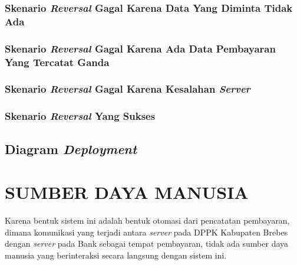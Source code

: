 \documentclass[pdftex,12pt, oneside]{article}
\begin{document}
\subsubsection{Skenario \textit{Reversal} Gagal Karena Data Yang Diminta Tidak Ada}
\subsubsection{Skenario \textit{Reversal} Gagal Karena Ada Data Pembayaran Yang Tercatat Ganda}
\subsubsection{Skenario \textit{Reversal} Gagal Karena Kesalahan \textit{Server}}
\subsubsection{Skenario \textit{Reversal} Yang Sukses}

\subsection{Diagram \textit{Deployment}}

\section{SUMBER DAYA MANUSIA}

Karena bentuk sistem ini adalah bentuk otomasi dari pencatatan pembayaran, dimana komunikasi yang terjadi antara \textit{server} pada DPPK Kabupaten Brebes dengan \textit{server} pada Bank sebagai tempat pembayaran, tidak ada sumber daya manusia yang berinteraksi secara langsung dengan sistem ini.
\end{document}
